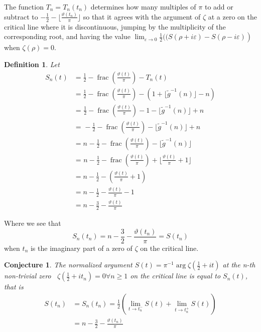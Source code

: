 \documentclass{article}
\newcommand{\tmop}[1]{\ensuremath{\operatorname{#1}}}
\newtheorem{conjecture}{Conjecture}
\newtheorem{definition}{Definition}
\begin{document}
The function $T_n = T_n (t_n)$ determines how many multiples of $\pi$ to add
or subtract to $- \frac{1}{2} - \lfloor \frac{\vartheta (t_n)}{\pi} \rfloor$
so that it agrees with the argument of $\zeta$ at a zero on the critical line
where it is discontinuous, jumping by the multiplicity of the corresponding
root, and having the value $\left. \lim_{\varepsilon \rightarrow 0} 
\frac{1}{2} ((S (\rho + i \varepsilon) - S (\rho - i \varepsilon) \right)$
when $\zeta (\rho) = 0$.

\begin{definition}
  Let
  \begin{equation}
    \begin{array}{ll}
      S_n (t_{}) & = \frac{1}{2} - \tmop{frac} \left( \frac{\vartheta
      (t)}{\pi} \right) - T_n (t)\\
      & = \frac{1}{2} - \tmop{frac} \left( \frac{\vartheta (t)}{\pi} \right)
      - (1 + \lfloor \tilde{g}^{- 1} (n) \rfloor - n)\\
      & =_{} \frac{1}{2} - \tmop{frac} \left( \frac{\vartheta (t)}{\pi}
      \right) - 1 - \lfloor \tilde{g}^{- 1} (n) \rfloor + n\\
      & =_{} - \frac{1}{2} - \tmop{frac} \left( \frac{\vartheta (t)}{\pi}
      \right) - \lfloor \tilde{g}^{- 1} (n) \rfloor + n\\
      & = n_{} - \frac{1}{2} - \tmop{frac} \left( \frac{\vartheta (t)}{\pi}
      \right) - \lfloor \tilde{g}^{- 1} (n) \rfloor\\
      & =_{} n - \frac{1}{2} - \tmop{frac} \left( \frac{\vartheta (t)}{\pi}
      \right) + \lfloor \frac{\vartheta (t)}{\pi} + 1 \rfloor\\
      & = n - \frac{1}{2} - \left( \frac{\vartheta (t)}{\pi} + 1 \right)\\
      & = n - \frac{1}{2} - \frac{\vartheta (t)}{\pi} - 1\\
      & = n - \frac{3}{2} - \frac{\vartheta (t)}{\pi}
    \end{array}
  \end{equation}
\end{definition}

Where we see that
\begin{equation}
  S_n (t_n) = n - \frac{3}{2} - \frac{\vartheta (t_n)}{\pi} = S (t_n)
\end{equation}
when $t_n$ is the imaginary part of a zero of $\zeta$ on the critical line.

\begin{conjecture}
  \label{c}The normalized argument $S (t) = \pi^{- 1} \arg \zeta \left(
  \frac{1}{2} + i t \right)$ at the n-th non-trivial zero \ $\zeta \left(
  \frac{1}{2} + i t_n \right) = 0 \forall n \geqslant 1$ on the critical line
  is equal to $S_n (t)$, that is
  \begin{equation}
    \begin{array}{cl}
      S (t_n) & = S_n (t_n) = \frac{1}{2} (\lim_{t \rightarrow t^-_n} S (t_{})
      + \lim_{t \rightarrow t^+_n} S (t_{}))\\
      & = n - \frac{3}{2} - \frac{\vartheta (t_n)}{\pi}
    \end{array} \label{een}
  \end{equation}
\end{conjecture}
\end{document}

